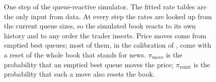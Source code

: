 \begin{figure}[!htbp]
\caption{One step of the queue-reactive simulator. The fitted rate tables are the only input from data.
At every step the rates are looked up from the current queue sizes, so the simulated book reacts to its
own history and to any order the trader inserts. Price moves come from emptied best queues; most of them,
in the calibration of \citet{huang2015}, come with a reset of the whole book that stands for news.
$\pi_{\text{move}}$ is the probability that an emptied best queue moves the price; $\pi_{\text{reinit}}$ is
the probability that such a move also resets the book.}
\label{fig:qr-loop}
\end{figure}

